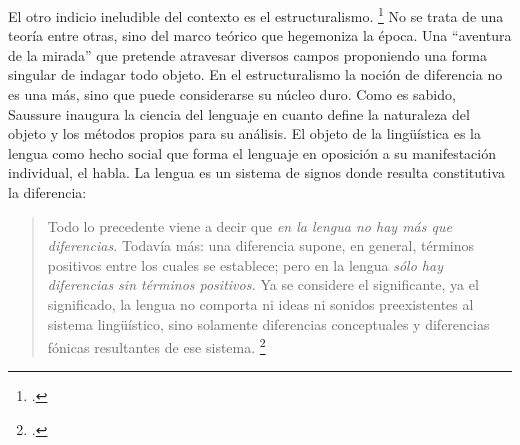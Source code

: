 El otro indicio ineludible del contexto es el estructuralismo. \footcite[Francois Dosse en su historia intelectual del estructuralismo señala la relevancia para la década del 60 del cruce entre el programa nietzscheano-heideggeriano y el estructuralismo: \enquote{La búsqueda heideggeriana del logos se une aquí con la genealogía nietzscheana, y ambas encontraron en el estructuralismo un magnifico destino. La crítica del etnocentrismo, del eurocentrismo, van a acentuarse en los años cincuenta y sesenta con la marea estructuralista, que va a retomar el paradigma crítico del nietzscheao-heideggerismo}][416]{@6967-DOSSE2004} No se trata de una teoría entre otras, sino del marco teórico que hegemoniza la época. Una \enquote{aventura de la mirada} que pretende atravesar diversos campos proponiendo una forma singular de indagar todo objeto. En el estructuralismo la noción de diferencia no es una más, sino que puede considerarse su núcleo duro. Como es sabido, Saussure inaugura la ciencia del lenguaje en cuanto define la naturaleza del objeto y los métodos propios para su análisis. El objeto de la lingüística es la lengua como hecho social que forma el lenguaje en oposición a su manifestación individual, el habla. La lengua es un sistema de signos donde resulta constitutiva la diferencia:

\begin{quote}
Todo lo precedente viene a decir que \emph{en la lengua no hay más que diferencias.} Todavía más: una diferencia supone, en general, términos positivos entre los cuales se establece; pero en la lengua \emph{sólo hay diferencias sin términos positivos.} Ya se considere el significante, ya el significado, la lengua no comporta ni ideas ni sonidos preexistentes al sistema lingüístico, sino solamente diferencias conceptuales y diferencias fónicas resultantes de ese sistema. \footcite[144]{@6968-SAUSSURE1945}
\end{quote}

